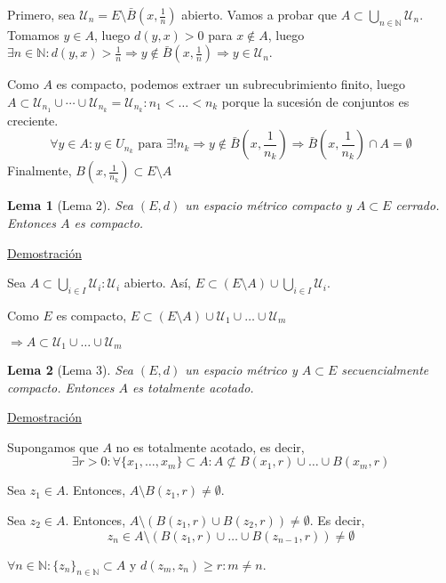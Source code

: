 \documentclass[10pt,a4paper,openright]{book}
\theoremstyle{break}
\newtheorem*{lema}{Lema}
\begin{document}
Primero, sea $\mathcal{U}_n = E \setminus \bar{B}\left(x, \frac{1}{n}\right)$ abierto. Vamos a probar que $A \subset \bigcup_{n \in \mathbb{N}} \mathcal{U}_n$. Tomamos $y \in A$, luego $d(y,x) > 0$ para $x\notin A$, luego $\exists n \in \mathbb{N} : d(y,x) > \frac{1}{n} \Rightarrow y \notin \bar{B}(x, \frac{1}{n})\Rightarrow y \in \mathcal{U}_n$.

Como $A$ es compacto, podemos extraer un subrecubrimiento finito, luego $A \subset \mathcal{U}_{n_1} \cup \cdots \cup \mathcal{U}_{n_k} = \mathcal{U}_{n_k} : n_1 < \ldots < n_k$ porque la sucesión de conjuntos es creciente.
$$\forall y \in A : y \in U_{n_k} \mbox{ para } \exists! n_k \Rightarrow y \notin \bar{B}\left(x, \frac{1}{n_k}\right) \Rightarrow \bar{B}\left(x, \frac{1}{n_k}\right) \cap A = \emptyset$$
Finalmente, $B\left(x, \frac{1}{n_k}\right) \subset E \setminus A$

\begin{lema}[Lema 2]
Sea $(E,d)$ un espacio métrico compacto y $A \subset E$ cerrado. Entonces $A$ es compacto.
\end{lema}

\underline{Demostración}

Sea $A \subset \bigcup_{i \in I} \mathcal{U}_i : \mathcal{U}_i$ abierto. Así, $E \subset (E \setminus A) \cup  \bigcup_{i \in I} \mathcal{U}_i$.

Como $E$ es compacto, $E \subset (E \setminus A) \cup \mathcal{U}_1 \cup \ldots \cup \mathcal{U}_m$

$\Rightarrow A \subset \mathcal{U}_1 \cup \ldots \cup \mathcal{U}_m$


\begin{lema}[Lema 3]
Sea $(E,d)$ un espacio métrico y $A \subset E$ secuencialmente compacto. Entonces $A$ es totalmente acotado.
\end{lema}

\underline{Demostración}

Supongamos que $A$ no es totalmente acotado, es decir, $$\exists r > 0 : \forall \{x_1, \ldots, x_m\} \subset A : A \not\subset B(x_1, r) \cup \ldots \cup B(x_m,r)$$

Sea $z_1 \in A$. Entonces, $A \setminus B(z_1,r) \neq \emptyset$.

Sea $z_2 \in A$. Entonces, $A \setminus \left( B(z_1,r) \cup B(z_2,r) \right) \neq \emptyset$. Es decir, $$z_n \in A \setminus \left( B(z_1,r) \cup \ldots \cup B(z_{n-1},r) \right) \neq \emptyset$$

$\forall n \in \mathbb{N} : \{z_n\}_{n \in \mathbb{N}} \subset A$ y $d(z_m, z_n) \geq r : m \neq n$.
\end{document}
